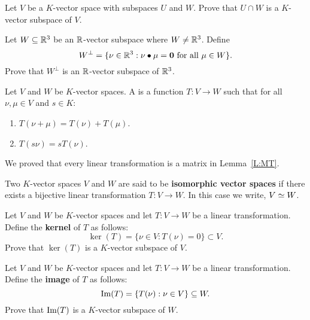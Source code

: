 \documentclass{ximera}
\begin{document}
\begin{exercise}
  Let $V$ be a $K$-vector space with subspaces $U$ and $W$. Prove that
  $U\cap W$ is a $K$-vector subspace of $V$.
\end{exercise}

\begin{exercise}
  Let $W\subseteq \mathbb R^3$ be an $\mathbb R$-vector subspace where $W\ne \mathbb R^3$.
  Define
  \[
  W^\perp = \{\nu\in\mathbb R^3: \nu \bullet \mu = \mathbf{0}\text{ for all $\mu\in W$} \}.
  \]
  Prove that $W^\perp$ is an $\mathbb R$-vector subspace of $\mathbb R^3$.
\end{exercise}


\begin{definition}
  Let $V$ and $W$ be $K$-vector spaces. A 
  is a function $T:V\to W$ such that for all $\nu,\mu\in V$ and $s\in
  K$:
    \begin{enumerate}
    \item $T(\nu+\mu) = T(\nu)+T(\mu)$.
    \item $T(s \nu) = sT(\nu)$.
    \end{enumerate}
\end{definition}

\begin{remark}
  We proved that every linear transformation is a matrix in
  Lemma~\ref{L:MT}.
\end{remark}

\begin{definition}
  Two $K$-vector spaces $V$ and $W$ are said to be \textbf{isomorphic
    vector spaces} if there exists a bijective linear transformation
  $T:V\to W$. In this case we write, $V\simeq W$.
\end{definition}

\begin{exercise}
  Let $V$ and $W$ be $K$-vector spaces and let $T:V\to W$ be a linear
  transformation. Define the \textbf{kernel} of $T$ as follows:
  \[
  \ker(T) = \{\nu\in V: T(\nu) = 0\}\subset V.
  \]
  Prove that $\ker(T)$ is a $K$-vector subspace of $V$.
\end{exercise}

\begin{exercise}
  Let $V$ and $W$ be $K$-vector spaces and let $T:V\to W$ be a linear
  transformation. Define the \textbf{image} of $T$ as follows:
  \[
  \operatorname{Im}(T) = \{T(\nu): \nu\in V\}\subseteq W.
  \]
  Prove that $\operatorname{Im}(T)$ is a $K$-vector subspace of $W$.
\end{exercise}
\end{document}
